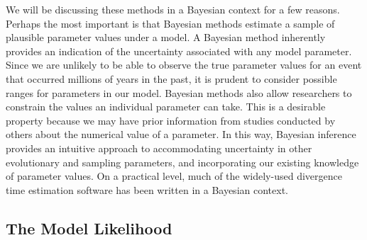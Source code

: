 We will be discussing these methods in a Bayesian context for a few reasons.
Perhaps the most important is that Bayesian methods estimate a sample of plausible parameter values under a model. 
A Bayesian method inherently provides an indication of the uncertainty associated with any model parameter.
Since we are unlikely to be able to observe the true parameter values for an event that occurred millions of years in the past, it is prudent to consider possible ranges for parameters in our model.
Bayesian methods also allow researchers to constrain the values an individual parameter can take. 
This is a desirable property because we may have prior information from studies conducted by others about the numerical value of a parameter.
In this way, Bayesian inference provides an intuitive approach to accommodating uncertainty in other evolutionary and sampling parameters, and incorporating our existing knowledge of parameter values.
On a practical level, much of the widely-used divergence time estimation software has been written in a Bayesian context.


\subsection{The Model Likelihood}


